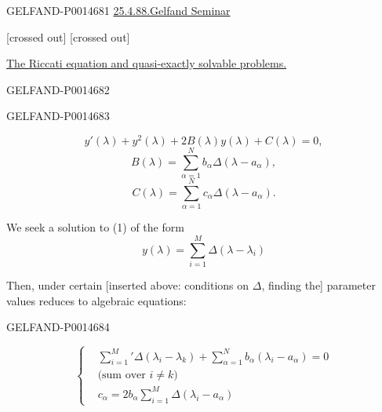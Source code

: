 \begin{GelfandAdjacentEvidence}{GELFAND-P001468}{1}
\underline{25.4.88.}\quad\underline{Gelfand Seminar}

 [crossed out]  [crossed out]

\uline{The Riccati equation and quasi-exactly solvable problems.}
\end{GelfandAdjacentEvidence}
\begin{GelfandAdjacentEvidence}{GELFAND-P001468}{2}

\end{GelfandAdjacentEvidence}
\begin{GelfandAdjacentEvidence}{GELFAND-P001468}{3}


\begin{equation*}
y'(\lambda)+y^2(\lambda)+2B(\lambda)y(\lambda)+C(\lambda)=0,
\tag{1}
\end{equation*}
\begin{equation*}
B(\lambda)=\sum_{\alpha=1}^N b_\alpha\Delta(\lambda-a_\alpha),
\tag{2}
\end{equation*}
\begin{equation*}
C(\lambda)=\sum_{\alpha=1}^N c_\alpha\Delta(\lambda-a_\alpha).
\tag{3}
\end{equation*}

We seek a solution to (1) of the form
\begin{equation*}
y(\lambda)=\sum_{i=1}^M\Delta(\lambda-\lambda_i)
\tag{4}
\end{equation*}

Then, under certain [inserted above: conditions on \(\Delta\), finding the] parameter values reduces to algebraic equations:
\end{GelfandAdjacentEvidence}
\begin{GelfandAdjacentEvidence}{GELFAND-P001468}{4}


\begin{equation*}
\left\{
\begin{aligned}
&\sum_{i=1}^{M}{}'\Delta(\lambda_i-\lambda_k)
 +\sum_{\alpha=1}^{N}b_\alpha(\lambda_i-a_\alpha)=0\\
&\text{(sum over }i\ne k\text{)}\\
&c_\alpha=2b_\alpha\sum_{i=1}^{M}\Delta(\lambda_i-a_\alpha)
\end{aligned}
\right.
\tag{5}
\end{equation*}
\end{GelfandAdjacentEvidence}
